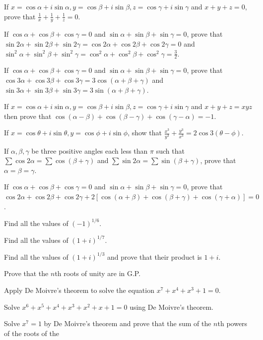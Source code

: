 \item If $x = \cos\alpha + i\sin\alpha, y = \cos\beta + i\sin\beta, z = \cos\gamma + i\sin\gamma$ and $x + y
  + z = 0$, prove that $\frac{1}{x} + \frac{1}{y} + \frac{1}{z} = 0$.
\item If $\cos\alpha + \cos\beta + \cos\gamma  = 0$ and $\sin\alpha + \sin\beta + \sin\gamma = 0$, prove
  that $\sin2\alpha + \sin2\beta + \sin2\gamma = \cos2\alpha + \cos2\beta + \cos2\gamma = 0$ and
  $\sin^2\alpha + \sin^2\beta + \sin^2\gamma = \cos^2\alpha + \cos^2\beta + \cos^2\gamma = \frac{3}{2}$.
\item If $\cos\alpha + \cos\beta + \cos\gamma  = 0$ and $\sin\alpha + \sin\beta + \sin\gamma = 0$, prove
  that $\cos3\alpha + \cos3\beta + \cos3\gamma = 3\cos(\alpha + \beta + \gamma)$ and $\sin3\alpha +
  \sin3\beta + \sin3\gamma = 3\sin(\alpha + \beta + \gamma)$.
\item If $x = \cos\alpha + i\sin\alpha, y = \cos\beta + i\sin\beta, z = \cos\gamma + i\sin\gamma$ and $x + y
  + z = xyz$ then prove that $\cos(\alpha - \beta) + \cos(\beta - \gamma) + \cos(\gamma - \alpha) = -1$.
\item If $x = \cos\theta + i\sin\theta, y = \cos\phi + i\sin\phi$, show that $\frac{x^3}{y^3} +
  \frac{y^3}{x^3} = 2\cos3(\theta - \phi)$.
\item If $\alpha, \beta, \gamma$ be three positive angles each less than $\pi$ such that $\sum\cos2\alpha =
  \sum\cos(\beta + \gamma)$ and $\sum\sin2\alpha = \sum\sin(\beta + \gamma)$, prove that $\alpha = \beta =
  \gamma$.
\item If $\cos\alpha + \cos\beta + \cos\gamma  = 0$ and $\sin\alpha + \sin\beta + \sin\gamma = 0$, prove
  that $\cos2\alpha + \cos2\beta + \cos2\gamma + 2[\cos(\alpha + \beta) + \cos(\beta + \gamma) + \cos(\gamma
    + \alpha)] = 0$.
\item Find all the values of $(-1)^{1/6}$.
\item Find all the values of $(1 + i)^{1/7}$.
\item Find all the values of $(1 + i)^{1/3}$ and prove that their product is $1 + i$.
\item Prove that the $n$th roots of unity are in G.P.
\item Apply De Moivre's theorem to solve the equation $x^7 + x^4 + x^3 + 1 = 0$.
\item Solve $x^6 + x^5 + x^4 + x^3 + x^2 + x + 1 = 0$ using De Moivre's theorem.
\item Solve $x^7 = 1$ by De Moivre's theorem and prove that the sum of the $n$th powers of the roots of the
